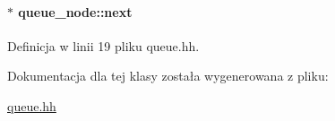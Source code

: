 \paragraph[{next}]{$\ast$ queue\+\_\+node\+::next}\label{classqueue__node_ae882ea3a1a117ff5c2a30cbd148ff1d4}


Definicja w linii 19 pliku queue.\+hh.



Dokumentacja dla tej klasy została wygenerowana z pliku\+:\begin{DoxyCompactItemize}
\item 
\hyperlink{queue_8hh}{queue.\+hh}\end{DoxyCompactItemize}
